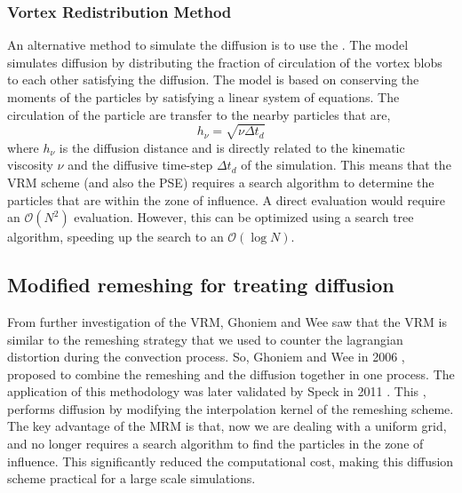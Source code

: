 \subsubsection*{Vortex Redistribution Method}
An alternative method to simulate the diffusion is to use the  \cite{Shankar1996}. The model simulates diffusion by distributing the fraction of circulation of the vortex blobs to each other satisfying the diffusion. The model is based on conserving the moments of the particles by satisfying a linear system of equations. The circulation of the particle are transfer to the nearby particles that are,
	\begin{equation}
	h_{\nu} = \sqrt{\nu\Delta t_d}
	\end{equation}
where $h_{\nu}$ is the diffusion distance and is directly related to the kinematic viscosity $\nu$ and the diffusive time-step $\Delta t_d$ of the simulation. This means that the VRM scheme (and also the PSE) requires a search algorithm to determine the particles that are within the zone of influence. A direct evaluation would require an $\mathcal{O}\left(N^2\right)$ evaluation. However, this can be optimized using a search tree algorithm, speeding up the search to an $\mathcal{O}\left(\log N\right)$.



\subsection{Modified remeshing for treating diffusion}
\label{subsec:modifiedRemeshing}
From further investigation of the VRM, Ghoniem and Wee saw that the VRM is similar to the remeshing strategy that we used to counter the lagrangian distortion during the convection process. So, Ghoniem and Wee in 2006 \cite{Wee2006a}, proposed to combine the remeshing and the diffusion together in one process. The application of this methodology was later validated by Speck in 2011 \cite{Speck2011a}. This , performs diffusion by modifying the interpolation kernel of the remeshing scheme. The key advantage of the MRM is that, now we are dealing with a uniform grid, and no longer requires a search algorithm to find the particles in the zone of influence. This significantly reduced the computational cost, making this diffusion scheme practical for a large scale simulations. 

